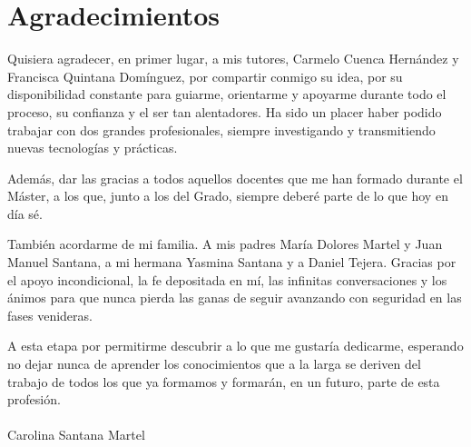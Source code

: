 \chapter*{Agradecimientos}

Quisiera agradecer, en primer lugar, a mis tutores, Carmelo Cuenca Hernández y Francisca Quintana Domínguez, por compartir conmigo su idea, por su disponibilidad constante para guiarme, orientarme y apoyarme durante todo el proceso, su confianza y el ser tan alentadores. Ha sido un placer haber podido trabajar con dos grandes profesionales, siempre investigando y transmitiendo nuevas tecnologías y prácticas.  

Además, dar las gracias a todos aquellos docentes que me han formado durante el Máster, a los que, junto a los del Grado, siempre deberé parte de lo que hoy en día sé.

También acordarme de mi familia. A mis padres María Dolores Martel y Juan Manuel Santana, a mi hermana Yasmina Santana y a Daniel Tejera. Gracias por el apoyo incondicional, la fe depositada en mí, las infinitas conversaciones y los ánimos para que nunca pierda las ganas de seguir avanzando con seguridad en las fases venideras.

A esta etapa por permitirme descubrir a lo que me gustaría dedicarme, esperando no dejar nunca de aprender los conocimientos que a la larga se deriven del trabajo de todos los que ya formamos y formarán, en un futuro, parte de esta profesión.
\\
\\
Carolina Santana Martel

